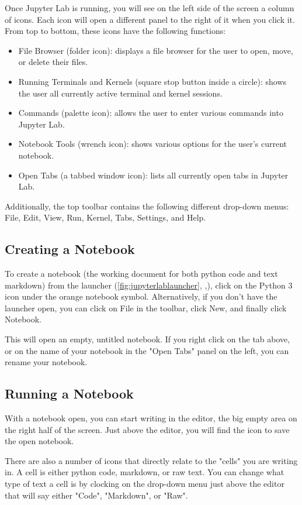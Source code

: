 \documentclass[pdftex,12pt]{artikel3}
\newcommand{\tabfigref}[1]{\autoref{#1}, \nameref{#1},}
\begin{document}
Once Jupyter Lab is running, you will see on the left side of the screen a column of icons. Each icon will open a different panel to the right of it when you click it. From top to bottom, these icons have the following functions:
\begin{itemize}
    \item File Browser (folder icon): displays a file browser for the user to open, move, or delete their files.
    \item Running Terminals and Kernels (square stop button inside a circle): shows the user all currently active terminal and kernel sessions.
    \item Commands (palette icon): allows the user to enter various commands into Jupyter Lab.
    \item Notebook Tools (wrench icon): shows various options for the user's current notebook.
    \item Open Tabs (a tabbed window icon): lists all currently open tabs in Jupyter Lab.
\end{itemize}

Additionally, the top toolbar contains the following different drop-down menus: File, Edit, View, Run, Kernel, Tabs, Settings, and Help.

\subsection{Creating a Notebook}

To create a notebook (the working document for both python code and text markdown) from the launcher (\tabfigref{fig:jupyterlablauncher}), click on the Python 3 icon under the orange notebook symbol. Alternatively, if you don't have the launcher open, you can click on File in the toolbar, click New, and finally click Notebook.

This will open an empty, untitled notebook. If you right click on the tab above, or on the name of your notebook in the "Open Tabs" panel on the left, you can rename your notebook.

\subsection{Running a Notebook}

With a notebook open, you can start writing in the editor, the big empty area on the right half of the screen. Just above the editor, you will find the icon to save the open notebook.

There are also a number of icons that directly relate to the "cells" you are writing in. A cell is either python code, markdown, or raw text. You can change what type of text a cell is by clocking on the drop-down menu just above the editor that will say either "Code", "Markdown", or "Raw".
\end{document}
